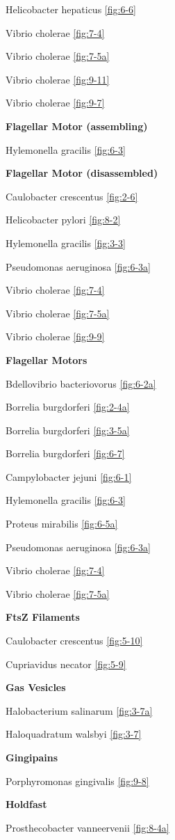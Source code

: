\documentclass[]{tufte-book}
\begin{document}
Helicobacter hepaticus \ref{fig:6-6}

Vibrio cholerae \ref{fig:7-4}

Vibrio cholerae \ref{fig:7-5a}

Vibrio cholerae \ref{fig:9-11}

Vibrio cholerae \ref{fig:9-7}

\textbf{Flagellar Motor (assembling)}

Hylemonella gracilis \ref{fig:6-3}

\textbf{Flagellar Motor (disassembled)}

Caulobacter crescentus \ref{fig:2-6}

Helicobacter pylori \ref{fig:8-2}

Hylemonella gracilis \ref{fig:3-3}

Pseudomonas aeruginosa \ref{fig:6-3a}

Vibrio cholerae \ref{fig:7-4}

Vibrio cholerae \ref{fig:7-5a}

Vibrio cholerae \ref{fig:9-9}

\textbf{Flagellar Motors}

Bdellovibrio bacteriovorus \ref{fig:6-2a}

Borrelia burgdorferi \ref{fig:2-4a}

Borrelia burgdorferi \ref{fig:3-5a}

Borrelia burgdorferi \ref{fig:6-7}

Campylobacter jejuni \ref{fig:6-1}

Hylemonella gracilis \ref{fig:6-3}

Proteus mirabilis \ref{fig:6-5a}

Pseudomonas aeruginosa \ref{fig:6-3a}

Vibrio cholerae \ref{fig:7-4}

Vibrio cholerae \ref{fig:7-5a}

\textbf{FtsZ Filaments}

Caulobacter crescentus \ref{fig:5-10}

Cupriavidus necator \ref{fig:5-9}

\textbf{Gas Vesicles}

Halobacterium salinarum \ref{fig:3-7a}

Haloquadratum walsbyi \ref{fig:3-7}

\textbf{Gingipains}

Porphyromonas gingivalis \ref{fig:9-8}

\textbf{Holdfast}

Prosthecobacter vanneervenii \ref{fig:8-4a}
\end{document}
